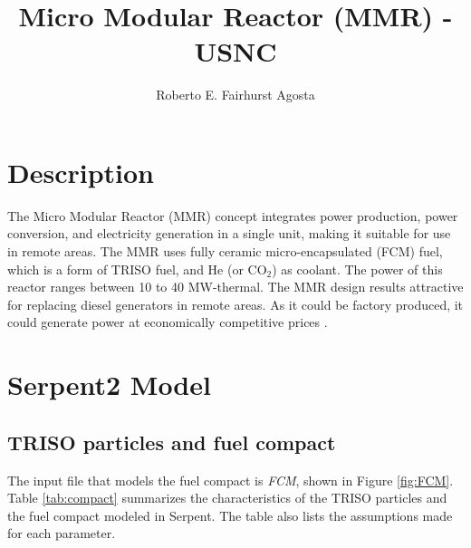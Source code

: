 \documentclass[11pt,letterpaper]{article}
\title{Micro Modular Reactor (MMR) - USNC}
\author{Roberto E. Fairhurst Agosta}
\begin{document}

\section{Description}

The Micro Modular Reactor (MMR) concept integrates power production, power conversion, and electricity generation in a single unit, making it suitable for use in remote areas. 
The MMR uses fully ceramic micro-encapsulated (FCM) fuel, which is a form of TRISO fuel, and He (or CO$_2$) as coolant.
The power of this reactor ranges between 10 to 40 MW-thermal.
The MMR design results attractive for replacing diesel generators in remote areas.
As it could be factory produced, it could generate power at economically competitive prices \cite{hawari_development_2018}.

\section{Serpent2 Model}

\subsection{TRISO particles and fuel compact}

The input file that models the fuel compact is \textit{FCM}, shown in Figure \ref{fig:FCM}.
Table \ref{tab:compact} summarizes the characteristics of the TRISO particles and the fuel compact modeled in Serpent.
The table also lists the assumptions made for each parameter.
\end{document}
